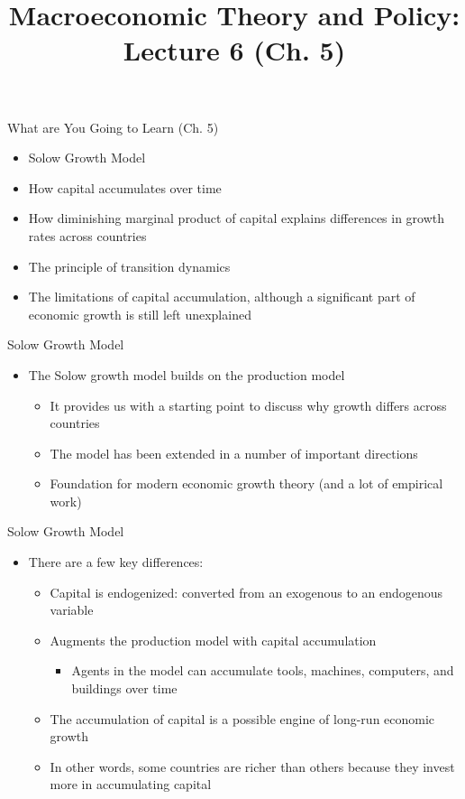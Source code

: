\documentclass[aspectratio=1610]{beamer}
\title[Fall - Lecture 6] %
{Macroeconomic Theory and Policy: Lecture  6 (Ch. 5)}
\author[University of Toronto] %
{}
\date[] %
\begin{document}
\begin{frame}
  \titlepage
\end{frame}

\begin{frame}[wide]{What are You Going to Learn (Ch. 5)}
	\begin{itemize}
		\item Solow Growth Model
		\item How capital accumulates over time
		\item How diminishing marginal product of capital explains differences in growth rates across countries
		\item The principle of transition dynamics
		\item The limitations of capital accumulation, although a significant part of economic growth is still left unexplained
	\end{itemize}
\end{frame}

\begin{frame}[wide]{Solow Growth Model}
	\begin{itemize}
		\item The Solow growth model builds on the production model
		\begin{itemize}
			\item It provides us with a starting point to discuss why growth differs across countries
			\item The model has been extended in a number of important directions
			\item Foundation for modern economic growth theory (and a lot of empirical work)
		\end{itemize}		
	\end{itemize}
\end{frame}

\begin{frame}[wide]{Solow Growth Model}
	\begin{itemize}
		\item There are a few key differences:
		\begin{itemize}
			\item Capital is endogenized: converted from an exogenous to an endogenous variable
			\item Augments the production model with capital accumulation
			\begin{itemize}
				\item Agents in the model can accumulate tools, machines, computers, and buildings over time
			\end{itemize}
			\item The accumulation of capital is a possible engine of long-run economic growth
			\item In other words, some countries are richer than others because they invest more in accumulating capital
		\end{itemize}
		
	\end{itemize}
\end{frame}
\end{document}
